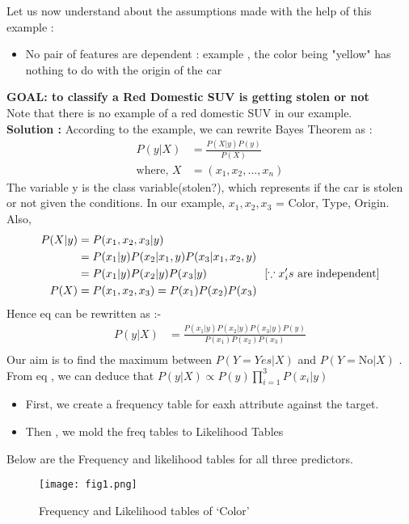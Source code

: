 \documentclass[a4paper, 11pt]{article}
\begin{document}
Let us now understand about the assumptions made with the help of this example :
\begin{itemize}
    \item No pair of features are dependent : example , the color being "yellow" has nothing to do with the origin of the car 
\end{itemize}
\textbf{GOAL: to classify a Red Domestic SUV is getting stolen or not } \\
Note that there is no example of a red domestic SUV in our example.\\
\textbf{Solution :} According to the example, we can rewrite Bayes Theorem as :
\begin{align}
    P(y|X) &= \frac{P(X|y)P(y)}{P(X)} \label{bayes}\\
    \text{where,   }X &= (x_1,x_2,...,x_n)
\end{align}
The variable y is the class variable(stolen?), which represents if the car is stolen or not given the conditions.
In our example, $x_1,x_2,x_3$  = Color, Type, Origin. Also,
\begin{align}
    P(X|y) &= P(x_1,x_2,x_3|y)\\
        &=P(x_1|y)P(x_2|x_1,y)P(x_3|x_1,x_2,y)\\
        &=P(x_1|y)P(x_2|y)P(x_3|y) \hspace{18mm} [\because x_i's \text{   are independent}]\\
    P(X) &= P(x_1,x_2,x_3) = P(x_1)P(x_2)P(x_3)
\end{align}
Hence eq  can be rewritten as :-
\begin{align}
    P(y|X) &= \frac{P(x_1|y)P(x_2|y)P(x_3|y)P(y)}{ P(x_1)P(x_2)P(x_3)} \label{bayes_new}\\
\end{align}
Our aim is to find the maximum between $P(Y=Yes|X)$ and $P(Y=\text{No}|X)$ . From eq  , we can deduce that 
$P(y|X)\propto P(y) \prod_{i=1}^{3}P(x_i|y) $ 
\begin{itemize}
    \item First, we create a frequency table for eaxh attribute against the target.
    \item Then , we mold the freq tables to Likelihood Tables
\end{itemize}
\pagebreak
Below are the Frequency and likelihood tables for all three predictors.\\
\begin{figure}[ht!]
    \texttt{[image: fig1.png]}
    \caption{Frequency and Likelihood tables of ‘Color’}
    \label{fig:fig1}
  \end{figure}
\end{document}
